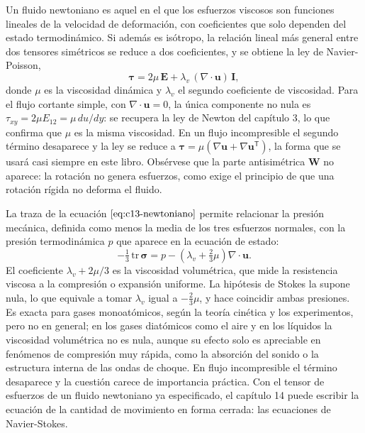 \documentclass[10pt,openany]{book}
\begin{document}
Un fluido newtoniano es aquel en el que los esfuerzos viscosos son funciones lineales de la velocidad de deformación, con coeficientes que solo dependen del estado termodinámico. Si además es isótropo, la relación lineal más general entre dos tensores simétricos se reduce a dos coeficientes, y se obtiene la ley de Navier-Poisson,
\begin{equation}
\boldsymbol{\tau} = 2\mu\,\mathbf{E} + \lambda_v\,(\nabla\cdot\mathbf{u})\,\mathbf{I}, \label{eq:c13-newtoniano}
\end{equation}
donde \(\mu\) es la viscosidad dinámica y \(\lambda_v\) el segundo coeficiente de viscosidad. Para el flujo cortante simple, con \(\nabla\cdot\mathbf{u} = 0\), la única componente no nula es \(\tau_{xy} = 2\mu E_{12} = \mu\,du/dy\): se recupera la ley de Newton del capítulo 3, lo que confirma que \(\mu\) es la misma viscosidad. En un flujo incompresible el segundo término desaparece y la ley se reduce a \(\boldsymbol{\tau} = \mu(\nabla\mathbf{u} + \nabla\mathbf{u}^{\mathsf{T}})\), la forma que se usará casi siempre en este libro. Obsérvese que la parte antisimétrica \(\mathbf{W}\) no aparece: la rotación no genera esfuerzos, como exige el principio de que una rotación rígida no deforma el fluido.

La traza de la ecuación \(\eqref{eq:c13-newtoniano}\) permite relacionar la presión mecánica, definida como menos la media de los tres esfuerzos normales, con la presión termodinámica \(p\) que aparece en la ecuación de estado:
\begin{equation}
-\tfrac13\,\mathrm{tr}\,\boldsymbol{\sigma} = p - \left(\lambda_v + \tfrac23\mu\right)\nabla\cdot\mathbf{u}. \label{eq:c13-presion}
\end{equation}
El coeficiente \(\lambda_v + 2\mu/3\) es la viscosidad volumétrica, que mide la resistencia viscosa a la compresión o expansión uniforme. La hipótesis de Stokes la supone nula, lo que equivale a tomar \(\lambda_v\) igual a \(-\tfrac23\mu\), y hace coincidir ambas presiones. Es exacta para gases monoatómicos, según la teoría cinética y los experimentos, pero no en general; en los gases diatómicos como el aire y en los líquidos la viscosidad volumétrica no es nula, aunque su efecto solo es apreciable en fenómenos de compresión muy rápida, como la absorción del sonido o la estructura interna de las ondas de choque. En flujo incompresible el término desaparece y la cuestión carece de importancia práctica. Con el tensor de esfuerzos de un fluido newtoniano ya especificado, el capítulo 14 puede escribir la ecuación de la cantidad de movimiento en forma cerrada: las ecuaciones de Navier-Stokes.
\end{document}
